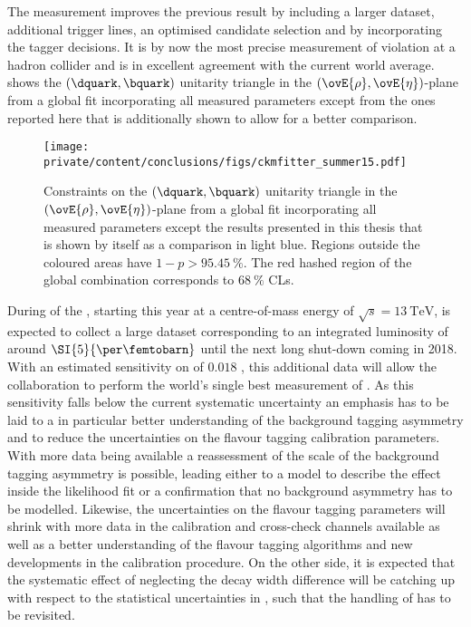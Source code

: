 The measurement improves the previous \LHCb result \cite{Aaij:1497268} by
including a larger dataset, additional trigger lines, an optimised candidate
selection and by incorporating the \SSpi tagger decisions. It is by now the most
precise measurement of \CP violation at a hadron collider and is in excellent
agreement with the current world average. 
shows the ${(\dquark,\bquark)}$ unitarity triangle in the
${(\ovE{\rho},\ovE{\eta})}$-plane from a global fit incorporating all measured
\CKM parameters \cite{Charles:2004jd} except from the ones reported here that is
additionally shown to allow for a better comparison.
%
\begin{figure}[ht]
\centering
\texttt{[image: private/content/conclusions/figs/ckmfitter\_summer15.pdf]}
\caption{Constraints on the ${(\dquark,\bquark)}$ unitarity triangle in the
${(\ovE{\rho},\ovE{\eta})}$-plane from a global fit incorporating all measured
\CKM parameters \cite{Charles:2004jd} except the results presented in this
thesis that is shown by itself as a comparison in light blue. Regions outside
the coloured areas have $1-p > \SI{95.45}{\percent}$. The red hashed region of
the global combination corresponds to $\SI{68}{\percent}$ \acp{CL}.}
\label{fig:conclusion:ckm_fitter_15}
\end{figure}

During \RunTwo of the \LHC, starting this year at a centre-of-mass energy of
$\sqrt{s} = \SI{13}{\TeV}$, \LHCb is expected to collect a large dataset
corresponding to an integrated luminosity of around $\SI{5}{\per\femtobarn}$
until the next long shut-down coming in 2018. With an estimated sensitivity on
\SJpsiKS of $\num{0.018}$ \cite{Moedden:2015}, this additional data will allow
the \LHCb collaboration to perform the world's single best measurement of
\sintwobeta. As this sensitivity falls below the current systematic uncertainty
an emphasis has to be laid to a in particular better understanding of the
background tagging asymmetry and to reduce the uncertainties on the flavour
tagging calibration parameters. With more data being available a reassessment of
the scale of the background tagging asymmetry is possible, leading either to a
model to describe the effect inside the likelihood fit or a confirmation that no
background asymmetry has to be modelled. Likewise, the uncertainties on the
flavour tagging parameters will shrink with more data in the calibration and
cross-check channels available as well as a better understanding of the flavour
tagging algorithms and new developments in the calibration procedure. On the
other side, it is expected \cite{Moedden:2015} that the systematic effect of
neglecting the decay width difference \DGd will be catching up with respect to
the statistical uncertainties in \RunTwo, such that the handling of \DGd has to
be revisited.

